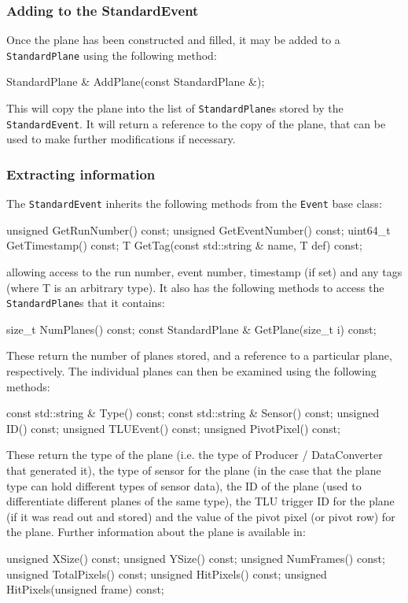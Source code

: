 \subsubsection{Adding to the StandardEvent}
Once the plane has been constructed and filled, it may be added to a \texttt{StandardPlane} using the following method:
\begin{listing}
StandardPlane & AddPlane(const StandardPlane &);
\end{listing}

This will copy the plane into the list of \texttt{StandardPlane}s stored by the \texttt{StandardEvent}.
It will return a reference to the copy of the plane, that can be used to make further modifications if necessary.

\subsubsection{Extracting information}
The \texttt{StandardEvent} inherits the following methods from the \texttt{Event} base class:
\begin{listing}
unsigned GetRunNumber() const;
unsigned GetEventNumber() const;
uint64_t GetTimestamp() const;
T GetTag(const std::string & name, T def) const;
\end{listing}

allowing access to the run number, event number, timestamp (if set) and any tags (where T is an arbitrary type).
It also has the following methods to access the \texttt{StandardPlane}s that it contains:
\begin{listing}
size_t NumPlanes() const;
const StandardPlane & GetPlane(size_t i) const;
\end{listing}

These return the number of planes stored, and a reference to a particular plane, respectively.
The individual planes can then be examined using the following methods:
\begin{listing}
const std::string & Type() const;
const std::string & Sensor() const;
unsigned ID() const;
unsigned TLUEvent() const;
unsigned PivotPixel() const;
\end{listing}

These return the type of the plane (i.e. the type of Producer / DataConverter that generated it),
the type of sensor for the plane (in the case that the plane type can hold different types of sensor data),
the ID of the plane (used to differentiate different planes of the same type),
the TLU trigger ID for the plane (if it was read out and stored)
and the value of the pivot pixel (or pivot row) for the plane.
Further information about the plane is available in:
\begin{listing}
unsigned XSize() const;
unsigned YSize() const;
unsigned NumFrames() const;
unsigned TotalPixels() const;
unsigned HitPixels() const;
unsigned HitPixels(unsigned frame) const;
\end{listing}

